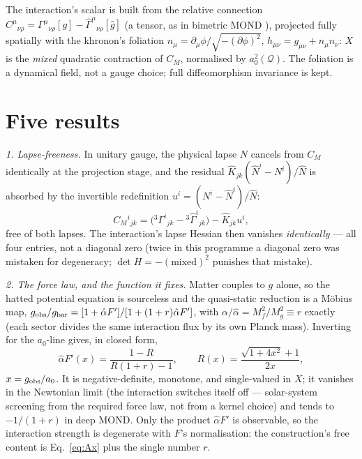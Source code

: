 \documentclass[aps,prd,twocolumn,10pt,nofootinbib,superscriptaddress]{revtex4-2}
\newcommand{\QQ}{\mathcal{Q}}
\begin{document}
The interaction's scalar is built from the relative connection
$C^\mu{}_{\nu\rho}=\Gamma^\mu{}_{\nu\rho}[g]-\hat\Gamma^\mu{}_{\nu\rho}[\hat g]$ (a tensor,
as in bimetric MOND \cite{BIMOND}), projected fully spatially with the khronon's foliation
$n_\mu=\partial_\mu\phi/\sqrt{-(\partial\phi)^2}$, $h_{\mu\nu}=g_{\mu\nu}+n_\mu n_\nu$:
$X$ is the \emph{mixed} quadratic contraction of $C_M$, normalised by $a_0^2(\QQ)$. The
foliation is a dynamical field, not a gauge choice; full diffeomorphism invariance is kept.

\section{Five results}

\emph{1. Lapse-freeness.} In unitary gauge, the physical lapse $N$ cancels from $C_M$
identically at the projection stage, and the residual $\hat K_{jk}(\hat N^i-N^i)/\hat N$
is absorbed by the invertible redefinition $u^i=(N^i-\hat N^i)/\hat N$:
\begin{equation}
C_M{}^i{}_{jk}=\big({}^{3}\Gamma^i{}_{jk}-{}^{3}\hat\Gamma^i{}_{jk}\big)-\hat K_{jk}u^i,
\end{equation}
free of both lapses. The interaction's lapse Hessian then vanishes \emph{identically} --- all
four entries, not a diagonal zero (twice in this programme a diagonal zero was mistaken for
degeneracy; $\det H=-(\text{mixed})^2$ punishes that mistake).

\emph{2. The force law, and the function it fixes.} Matter couples to $g$ alone, so the hatted
potential equation is sourceless and the quasi-static reduction is a M\"obius map,
$g_{\rm obs}/g_{\rm bar}=[1+\hat\alpha F']/[1+(1+r)\hat\alpha F']$, with
$\alpha/\hat\alpha=M_f^2/M_g^2\equiv r$ exactly (each sector divides the same interaction flux
by its own Planck mass). Inverting for the $a_0$-line gives, in closed form,
\begin{equation}
\hat\alpha F'(x)=\frac{1-R}{R(1+r)-1},\qquad R(x)=\frac{\sqrt{1+4x^2}+1}{2x},
\label{eq:Ax}
\end{equation}
$x=g_{\rm obs}/a_0$. It is negative-definite, monotone, and single-valued in $X$; it vanishes
in the Newtonian limit (the interaction switches itself off --- solar-system screening from the
required force law, not from a kernel choice) and tends to $-1/(1+r)$ in deep MOND. Only the
product $\hat\alpha F'$ is observable, so the interaction strength is degenerate with $F$'s
normalisation: the construction's free content is Eq.~\eqref{eq:Ax} plus the single number $r$.
\end{document}
